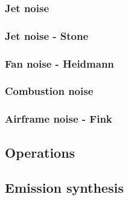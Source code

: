 \subsubsection{Jet noise }


%

\subsubsection{Jet noise - Stone}

\subsubsection{Fan noise - Heidmann}

\subsubsection{Combustion noise}

\subsubsection{Airframe noise - Fink}



\subsection{Operations}

\subsection{Emission synthesis}
